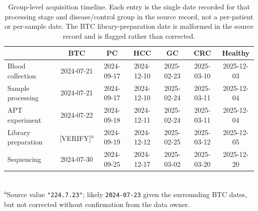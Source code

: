 \begin{table}[t]
\centering
\caption{Group-level acquisition timeline. Each entry is the single date
recorded for that processing stage and disease/control group in the source
record, not a per-patient or per-sample date. The BTC library-preparation date
is malformed in the source record and is flagged rather than corrected.}
\label{tab:acquisition_timeline}
\begin{tabular}{lcccccc}
\toprule
 & BTC & PC & HCC & GC & CRC & Healthy \\
\midrule
Blood collection    & 2024-07-21 & 2024-09-17 & 2024-12-10 & 2025-02-23 & 2025-03-10 & 2025-12-03 \\
Sample processing   & 2024-07-21 & 2024-09-17 & 2024-12-10 & 2025-02-24 & 2025-03-11 & 2025-12-04 \\
APT experiment       & 2024-07-22 & 2024-09-18 & 2024-12-11 & 2025-02-24 & 2025-03-11 & 2025-12-04 \\
Library preparation  & [VERIFY]\textsuperscript{a} & 2024-09-19 & 2024-12-12 & 2025-02-25 & 2025-03-12 & 2025-12-05 \\
Sequencing           & 2024-07-30 & 2024-09-25 & 2024-12-17 & 2025-03-02 & 2025-03-20 & 2025-12-20 \\
\bottomrule
\end{tabular}
\\[2pt]
{\footnotesize\textsuperscript{a}Source value \texttt{"224.7.23"}; likely \texttt{2024-07-23} given
the surrounding BTC dates, but not corrected without confirmation from the data owner.}
\end{table}
